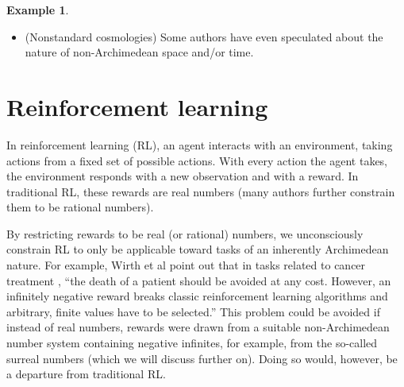 \documentclass[reqno]{article}
\theoremstyle{definition}
\newtheorem{example}[theorem]{Example}
\begin{document}
\begin{example}
\begin{itemize}
        impossible to measure machine intelligence using real numbers without some
        of those measurements being misleading\footnote{This solves an open problem
        implicitly stated by Legg and Hutter \cite{legg} when they said of their
        real-number universal intelligence measure: ``...none of these people have
        been able to communicate why the work [on measuring universal intelligence
        using real numbers] is so obviously flawed in any concrete way ...
        If anyone would like to properly explain their position to us in the future,
        we promise not to chase you down the street!''}.
        \item
        (Nonstandard cosmologies)
        Some
        authors \cite{al2016surreal} \cite{andreka2012logic} \cite{rosinger2007cosmic} have
        even speculated about the nature of non-Archimedean space and/or
        time.
    \end{itemize}
\end{example}

\section{Reinforcement learning}

In reinforcement learning (RL), an agent interacts with an environment,
taking actions from a fixed set of possible actions. With every action the
agent takes, the environment responds with a new observation and with a
reward. In traditional RL, these rewards are real numbers (many
authors further constrain them to be rational numbers).

By restricting rewards to be real (or rational) numbers, we unconsciously
constrain RL to only be applicable toward tasks of an inherently Archimedean
nature. For example, Wirth et al point out \cite{wirth2017survey} that
in tasks related to cancer treatment \cite{zhao2009reinforcement},
``the death of a patient should be avoided at any cost. However, an
infinitely negative reward breaks classic reinforcement learning algorithms
and arbitrary, finite values have to be selected.'' This problem could be
avoided if instead of real numbers, rewards were drawn from a suitable
non-Archimedean number system containing negative infinites,
for example, from the so-called
surreal numbers (which we will discuss further on). Doing so would, however,
be a departure from traditional RL.
\end{document}

